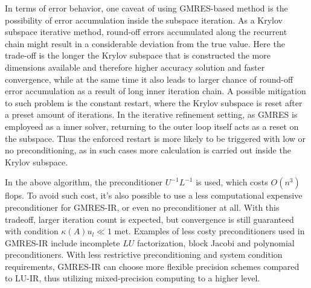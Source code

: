 In terms of error behavior, one caveat of using GMRES-based method is the possibility of error accumulation inside the subspace iteration. As a Krylov subspace iterative method, round-off errors accumulated along the recurrent chain might result in a considerable deviation from the true value. Here the trade-off is the longer the Krylov subspace that is constructed the more dimensions available and therefore higher accuracy solution and faster convergence, while at the same time it also leads to larger chance of round-off error accumulation as a result of long inner iteration chain. A possible mitigation to such problem is the constant restart, where the Krylov subspace is reset after a preset amount of iterations. In the iterative refinement setting, as GMRES is employeed as a inner solver, returning to the outer loop itself acts as a reset on the subspace. Thus the enforced restart is more likely to be triggered with low or no preconditioning, as in such cases more calculation is carried out inside the Krylov subspace.

In the above algorithm, the preconditioner $U^{-1}L^{-1}$ is used, which costs $O(n^3)$ flops. To avoid such cost, it's also possible to use a less computational expensive preconditioner for GMRES-IR, or even no preconditioner at all. With this tradeoff, larger iteration count is expected, but convergence is still guaranteed with condition $\kappa(A)u_l \ll 1$ met. Examples of less costy preconditioners used in GMRES-IR include incomplete $LU$ factorization, block Jacobi and polynomial preconditioners\cite{Loe2021}. With less restrictive preconditioning and system condition requirements, GMRES-IR can choose more flexible precision schemes compared to LU-IR, thus utilizing mixed-precision computing to a higher level. 

\clearpage




